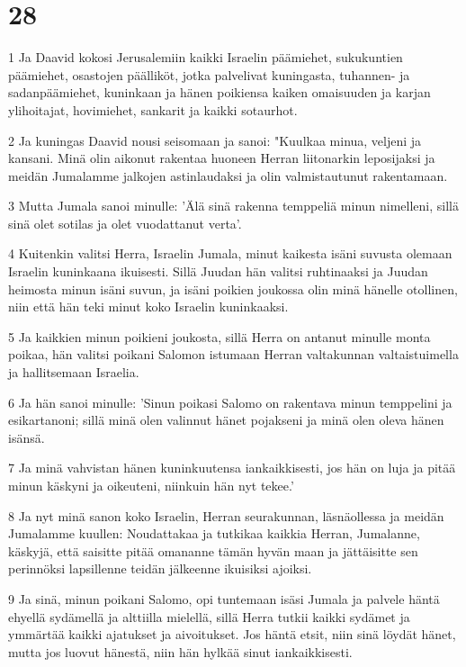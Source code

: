 \chapter{28}

\par 1 Ja Daavid kokosi Jerusalemiin kaikki Israelin päämiehet, sukukuntien päämiehet, osastojen päälliköt, jotka palvelivat kuningasta, tuhannen- ja sadanpäämiehet, kuninkaan ja hänen poikiensa kaiken omaisuuden ja karjan ylihoitajat, hovimiehet, sankarit ja kaikki sotaurhot.
\par 2 Ja kuningas Daavid nousi seisomaan ja sanoi: "Kuulkaa minua, veljeni ja kansani. Minä olin aikonut rakentaa huoneen Herran liitonarkin leposijaksi ja meidän Jumalamme jalkojen astinlaudaksi ja olin valmistautunut rakentamaan.
\par 3 Mutta Jumala sanoi minulle: 'Älä sinä rakenna temppeliä minun nimelleni, sillä sinä olet sotilas ja olet vuodattanut verta'.
\par 4 Kuitenkin valitsi Herra, Israelin Jumala, minut kaikesta isäni suvusta olemaan Israelin kuninkaana ikuisesti. Sillä Juudan hän valitsi ruhtinaaksi ja Juudan heimosta minun isäni suvun, ja isäni poikien joukossa olin minä hänelle otollinen, niin että hän teki minut koko Israelin kuninkaaksi.
\par 5 Ja kaikkien minun poikieni joukosta, sillä Herra on antanut minulle monta poikaa, hän valitsi poikani Salomon istumaan Herran valtakunnan valtaistuimella ja hallitsemaan Israelia.
\par 6 Ja hän sanoi minulle: 'Sinun poikasi Salomo on rakentava minun temppelini ja esikartanoni; sillä minä olen valinnut hänet pojakseni ja minä olen oleva hänen isänsä.
\par 7 Ja minä vahvistan hänen kuninkuutensa iankaikkisesti, jos hän on luja ja pitää minun käskyni ja oikeuteni, niinkuin hän nyt tekee.'
\par 8 Ja nyt minä sanon koko Israelin, Herran seurakunnan, läsnäollessa ja meidän Jumalamme kuullen: Noudattakaa ja tutkikaa kaikkia Herran, Jumalanne, käskyjä, että saisitte pitää omananne tämän hyvän maan ja jättäisitte sen perinnöksi lapsillenne teidän jälkeenne ikuisiksi ajoiksi.
\par 9 Ja sinä, minun poikani Salomo, opi tuntemaan isäsi Jumala ja palvele häntä ehyellä sydämellä ja alttiilla mielellä, sillä Herra tutkii kaikki sydämet ja ymmärtää kaikki ajatukset ja aivoitukset. Jos häntä etsit, niin sinä löydät hänet, mutta jos luovut hänestä, niin hän hylkää sinut iankaikkisesti.
